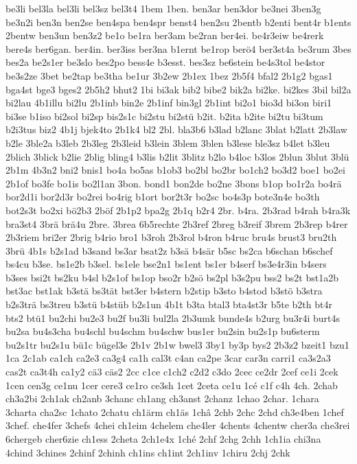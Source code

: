 {be3li
bel3la
bel3li
bel3sz
bel3t4
1bem
1ben.
ben3ar
ben3dor
be3nei
3ben3g
be3n2i
ben3n
ben2se
ben4spa
ben4spr
benst4
ben2su
2bentb
b2enti
bent4r
b1ents
2bentw
ben3un
ben3z2
be1o
be1ra
ber3am
be2ran
ber4ei.
be4r3eiw
be4rerk
bere4s
ber6gan.
ber4in.
ber3iss
ber3na
b1ernt
be1rop
berö4
ber3st4a
be3rum
3bes
bes2a
be2s1er
be3slo
bes2po
bess4e
b3esst.
bes3sz
be6stein
be4s3tol
be4stor
be3s2ze
3bet
be2tap
be3tha
be1ur
3b2ew
2b1ex
1bez
2b5f4
bfal2
2b1g2
bgas1
bga4st
bge3
bges2
2b5h2
bhut2
1bi
bi3ak
bib2
bibe2
bik2a
bi2ke.
bi2kes
3bil
bil2a
bi2lau
4b1illu
bi2lu
2b1inb
bin2e
2b1inf
bin3gl
2b1int
bi2o1
bio3d
bi3on
biri1
bi3se
b1iso
bi2sol
bi2sp
bis2s1c
bi2stu
bi2stü
b2it.
b2ita
b2ite
bi2tu
bi3tum
b2i3tus
biz2
4b1j
bjek4to
2b1k4
bl2
2bl.
bla3b6
b3lad
b2lanc
3blat
b2latt
2b3law
b2le
3ble2a
b3leb
2b3leg
2b3leid
b3lein
3blem
3blen
b3lese
ble3sz
b4let
b3leu
2blich
3blick
b2lie
2blig
bling4
b3lis
b2lit
3blitz
b2lo
b4loc
b3los
2blun
3blut
3blü
2b1m
4b3n2
bni2
bnis1
bo4a
bo5as
b1ob3
bo2bl
bo2br
bo1ch2
bo3d2
boe1
bo2ei
2b1of
bo3fe
bo1is
bo2l1an
3bon.
bond1
bon2de
bo2ne
3bons
b1op
bo1r2a
bo4rä
bor2d1i
bor2d3r
bo2rei
bo4rig
b1ort
bor2t3r
bo2sc
bo4s3p
bote3n4e
bo3th
bot2s3t
bo2xi
bö2b3
2böf
2b1p2
bpa2g
2b1q
b2r4
2br.
b4ra.
2b3rad
b4rah
b4ra3k
bra3st4
3brä
brä4u
2bre.
3brea
6b5rechte
2b3ref
2breg
b3reif
3brem
2b3rep
b4rer
2b3riem
bri2er
2brig
b4rio
bro1
b3roh
2b3rol
b4ron
b4ruc
bru4s
brust3
bru2th
3brü
4b1s
b2s1ad
b3sand
bs3ar
bsat2z
b3sä
b4sär
b5sc
bs2ca
b6schan
b6schef
bs4cu
b3se.
bs1e2b
b3sel.
bs1ele
bse2n1
bs1ent
bs1er
b4serf
bs3e4r3in
b4sers
b3ses
bsi2t
bs2ku
b4sl
b2s1of
bs1op
bso2r
b2sö
bs2pl
b3s2pu
bss2
bs2t
bst1a2b
bst3ac
bst1ak
b3stä
bs3tät
bst3er
b4stern
b2stip
b3sto
b4stod
b3stö
b3stra
b2s3trä
bs3treu
b3stü
b4stüb
b2s1un
4b1t
b3ta
btal3
bta4st3r
b5te
b2th
bt4r
bts2
btü1
bu2chi
bu2e3
bu2f
bu3li
bul2la
2b3umk
bunde4s
b2urg
bu3r4i
burt4s
bu2sa
bu4s3cha
bu4schl
bu4schm
bu4schw
bus1er
bu2sin
bu2s1p
bu6sterm
bu2s1tr
bu2s1u
bü1c
bügel3e
2b1v
2b1w
bwel3
3by1
by3p
bys2
2b3z2
bzeit1
bzu1
1ca
2c1ab
ca1ch
ca2e3
ca3g4
ca1h
cal3t
c4an
ca2pe
3car
car3n
carri1
ca3s2a3
cas2t
ca3t4h
ca1y2
cä3
cäs2
2cc
c1ce
c1ch2
c2d2
c3do
2cec
ce2dr
2cef
ce1i
2cek
1cen
cen3g
ce1nu
1cer
cere3
ce1ro
ce3sh
1cet
2ceta
ce1u
1cé
c1f
c4h
4ch.
2chab
ch3a2bi
2ch1ak
ch2anb
3chanc
ch1ang
ch3anst
2chanz
1chao
2char.
1chara
3charta
cha2sc
1chato
2chatu
ch1ärm
ch1äs
1châ
2chb
2chc
2chd
ch3e4ben
1chef
3chef.
che4fer
3chefs
4chei
ch1eim
4chelem
che4ler
4chents
4chentw
cher3a
che3rei
6chergeb
cher6zie
ch1ess
2cheta
2ch1e4x
1ché
2chf
2chg
2chh
1ch1ia
chi3na
4chind
3chines
2chinf
2chinh
ch1ins
ch1int
2ch1inv
1chiru
2chj
2chk
}

